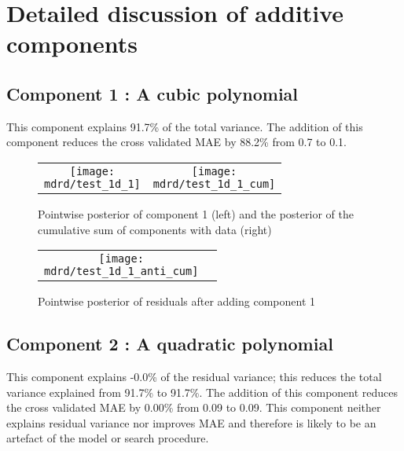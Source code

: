 \documentclass{article} %
\begin{document}
\section{Detailed discussion of additive components}
\label{sec:discussion}

\subsection{Component 1 : A cubic polynomial}



This component explains 91.7\% of the total variance.
The addition of this component reduces the cross validated MAE by 88.2\% from 0.7 to 0.1.


\begin{figure}[H]
\newcommand{\wmgd}{0.5\columnwidth}
\newcommand{\hmgd}{3.0cm}
\newcommand{\mdrd}{test_1d}
\newcommand{\mbm}{\hspace{-0.3cm}}
\begin{tabular}{cc}
\mbm \texttt{[image: \\mdrd/test\_1d\_1]} & \texttt{[image: \\mdrd/test\_1d\_1\_cum]}
\end{tabular}
\caption{Pointwise posterior of component 1 (left) and the posterior of the cumulative sum of components with data (right)}
\label{fig:comp1}
\end{figure}

\begin{figure}[H]
\newcommand{\wmgd}{0.5\columnwidth}
\newcommand{\hmgd}{3.0cm}
\newcommand{\mdrd}{test_1d}
\newcommand{\mbm}{\hspace{-0.3cm}}
\begin{tabular}{cc}
\mbm \texttt{[image: \\mdrd/test\_1d\_1\_anti\_cum]}
\end{tabular}
\caption{Pointwise posterior of residuals after adding component 1}
\label{fig:comp1}
\end{figure}

\subsection{Component 2 : A quadratic polynomial}



This component explains -0.0\% of the residual variance; this reduces the total variance explained from 91.7\% to 91.7\%.
The addition of this component reduces the cross validated MAE by 0.00\% from 0.09 to 0.09.
This component neither explains residual variance nor improves MAE and therefore is likely to be an artefact of the model or search procedure.
\end{document}
